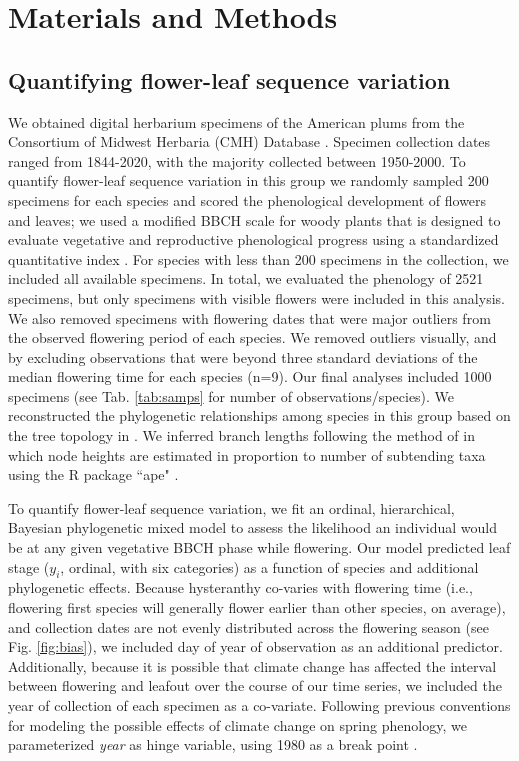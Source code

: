 \documentclass{article}[12pt]
\begin{document}
\section*{Materials and Methods}
\subsection*{Quantifying flower-leaf sequence variation}  
We obtained digital herbarium specimens of the American plums from the Consortium of Midwest Herbaria (CMH) Database \citep{CMH}. Specimen collection dates ranged from 1844-2020, with the majority collected between 1950-2000. To quantify flower-leaf sequence variation in this group we randomly sampled 200 specimens for each species and scored the phenological development of flowers and leaves; we used a modified BBCH scale for woody plants that is designed to evaluate vegetative and reproductive phenological progress using a standardized quantitative index \citep{Finn2007}. For species with less than 200 specimens in the collection, we included all available specimens. In total, we evaluated the phenology of 2521 specimens, but only specimens with visible flowers were included in this analysis. We also removed specimens with flowering dates that were major outliers from the observed flowering period of each species. We removed outliers visually, and by excluding observations that were beyond three standard deviations of the median flowering time for each species (n=9). Our final analyses included 1000 specimens (see Tab. \ref{tab:samps} for number of observations/species). We reconstructed the phylogenetic relationships among species in this group based on the tree topology in \citet{Shaw:2004aa}. We inferred branch lengths following the method of \citet{Granfen1989} in which node heights are estimated in proportion to number of subtending taxa using the R package ``ape" \citep{Paradis2019}.

To quantify flower-leaf sequence variation, we fit an ordinal, hierarchical, Bayesian phylogenetic mixed model \citep{Garamszegi2014} to assess the likelihood an individual would be at any given vegetative BBCH phase while flowering. Our model predicted leaf stage ($y_i$, ordinal, with six categories) as a function of species and additional phylogenetic effects. Because hysteranthy co-varies with flowering time (i.e., flowering first species will generally flower earlier than other species, on average), and collection dates are not evenly distributed across the flowering season (see Fig. \ref{fig:bias}), we included day of year of observation as an additional predictor. Additionally, because it is possible that climate change has affected the interval between flowering and leafout over the course of our time series, we included the year of collection of each specimen as a co-variate. Following previous conventions for modeling the possible effects of climate change on spring phenology, we parameterized \emph{year} as hinge variable, using 1980 as a break point \citep{IPCC2013,Buonaiuto2020,Kharouba2018}.
\end{document}
